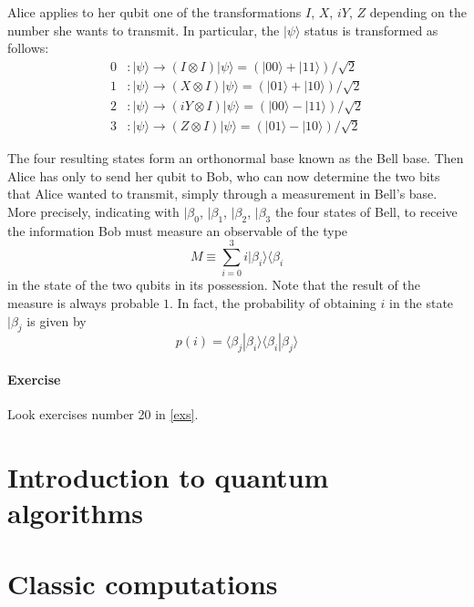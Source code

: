 \documentclass[a4paper,10pt]{article}
\begin{document}
Alice applies to her qubit one of the transformations $I$, $X$, $iY$, $Z$ depending on the number she wants to transmit. In particular, the $|\psi\rangle$ status is transformed as follows:
\begin{equation}
\begin{split}
0 & : |\psi\rangle \rightarrow{} (I \otimes I)|\psi\rangle = (|00\rangle + |11\rangle) / \sqrt{2} \\
1 & : |\psi\rangle \rightarrow{} (X \otimes I)|\psi\rangle = (|01\rangle + |10\rangle) / \sqrt{2} \\
2 & : |\psi\rangle \rightarrow{} (iY \otimes I)|\psi\rangle = (|00\rangle - |11\rangle) / \sqrt{2} \\
3 & : |\psi\rangle \rightarrow{} (Z \otimes I)|\psi\rangle = (|01\rangle - |10\rangle) / \sqrt{2}
\end{split}
\label{eq:aliceBitTransform}
\end{equation}

The four resulting states form an orthonormal base known as the Bell base. Then Alice has only to send her qubit to Bob, who can now determine the two bits that Alice wanted to transmit, simply through a measurement in Bell's base. More precisely, indicating with $|\beta_0$, $|\beta_1$, $|\beta_2$, $|\beta_3$ the four states of Bell, to receive the information Bob must measure an observable of the type
$$M \equiv \sum\limits_{i=0}^{3}i|\beta_i\rangle\langle\beta_i$$ in the state of the two qubits in its possession. Note that the result of the measure is always probable $1$. In fact, the probability of obtaining $i$ in the state $|\beta_j$ is given by
$$p(i) = \langle\beta_j|\beta_i\rangle\langle\beta_i|\beta_j\rangle$$

\paragraph{Exercise} Look exercises number 20 in \autoref{exs}.

\section*{Introduction to quantum algorithms}

\section{Classic computations}
\end{document}
